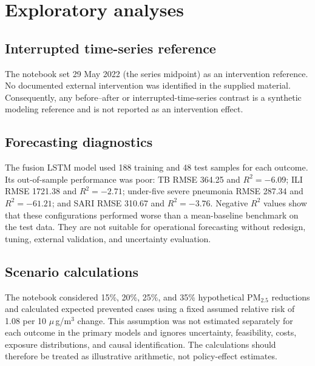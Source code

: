 \documentclass[12pt,a4paper]{report}
\newcommand{\pmfive}{PM$_{2.5}$}
\newcommand{\ugm}{\ensuremath{\mu}\,g/m$^3$}
\begin{document}
\chapter{Exploratory analyses}\label{app:exploratory}
\section{Interrupted time-series reference}
The notebook set 29 May 2022 (the series midpoint) as an intervention reference. No documented external intervention was identified in the supplied material. Consequently, any before--after or interrupted-time-series contrast is a synthetic modeling reference and is not reported as an intervention effect.

\section{Forecasting diagnostics}
The fusion LSTM model used 188 training and 48 test samples for each outcome. Its out-of-sample performance was poor: TB RMSE 364.25 and $R^2=-6.09$; ILI RMSE 1721.38 and $R^2=-2.71$; under-five severe pneumonia RMSE 287.34 and $R^2=-61.21$; and SARI RMSE 310.67 and $R^2=-3.76$. Negative $R^2$ values show that these configurations performed worse than a mean-baseline benchmark on the test data. They are not suitable for operational forecasting without redesign, tuning, external validation, and uncertainty evaluation.

\section{Scenario calculations}
The notebook considered 15\%, 20\%, 25\%, and 35\% hypothetical \pmfive{} reductions and calculated expected prevented cases using a fixed assumed relative risk of 1.08 per 10 \ugm{} change. This assumption was not estimated separately for each outcome in the primary models and ignores uncertainty, feasibility, costs, exposure distributions, and causal identification. The calculations should therefore be treated as illustrative arithmetic, not policy-effect estimates.

\printbibliography
\end{document}
